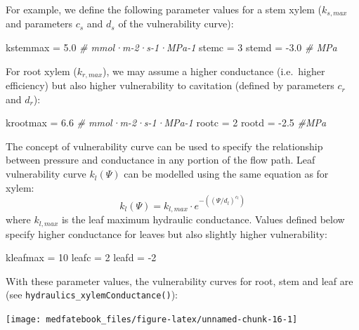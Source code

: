 \documentclass[]{book}
\newenvironment{Shaded}{\begin{snugshade}}{\end{snugshade}}
\newcommand{\DecValTok}[1]{\textcolor[rgb]{0.00,0.00,0.81}{#1}}
\newcommand{\FloatTok}[1]{\textcolor[rgb]{0.00,0.00,0.81}{#1}}
\newcommand{\StringTok}[1]{\textcolor[rgb]{0.31,0.60,0.02}{#1}}
\newcommand{\CommentTok}[1]{\textcolor[rgb]{0.56,0.35,0.01}{\textit{#1}}}
\newcommand{\NormalTok}[1]{#1}
\begin{document}
For example, we define the following parameter values for a stem xylem (\(k_{s,max}\) and parameters \(c_s\) and \(d_s\) of the vulnerability curve):

\begin{Shaded}
\begin{Highlighting}[]
\NormalTok{kstemmax =}\StringTok{ }\FloatTok{5.0} \CommentTok{# mmol·m-2·s-1·MPa-1}
\NormalTok{stemc =}\StringTok{ }\DecValTok{3} 
\NormalTok{stemd =}\StringTok{ }\FloatTok{-3.0} \CommentTok{# MPa}
\end{Highlighting}
\end{Shaded}

For root xylem (\(k_{r,max}\)), we may assume a higher conductance (i.e.~higher efficiency) but also higher vulnerability to cavitation (defined by parameters \(c_r\) and \(d_r\)):

\begin{Shaded}
\begin{Highlighting}[]
\NormalTok{krootmax =}\StringTok{ }\FloatTok{6.6} \CommentTok{# mmol·m-2·s-1·MPa-1}
\NormalTok{rootc =}\StringTok{ }\DecValTok{2}
\NormalTok{rootd =}\StringTok{ }\FloatTok{-2.5} \CommentTok{#MPa}
\end{Highlighting}
\end{Shaded}

The concept of vulnerability curve can be used to specify the relationship between pressure and conductance in any portion of the flow path. Leaf vulnerability curve \(k_l(\Psi)\) can be modelled using the same equation as for xylem:
\begin{equation}
k_l(\Psi) = k_{l,max}\cdot e^{-((\Psi/d_l)^{c_l})}
\label{eq:leafvulnerability}
\end{equation}
where \(k_{l,max}\) is the leaf maximum hydraulic conductance. Values defined below specify higher conductance for leaves but also slightly higher vulnerability:

\begin{Shaded}
\begin{Highlighting}[]
\NormalTok{kleafmax =}\StringTok{ }\DecValTok{10}
\NormalTok{leafc =}\StringTok{ }\DecValTok{2}
\NormalTok{leafd =}\StringTok{ }\DecValTok{-2}
\end{Highlighting}
\end{Shaded}

With these parameter values, the vulnerability curves for root, stem and leaf are (see \texttt{hydraulics\_xylemConductance()}):

\begin{center}\texttt{[image: medfatebook\_files/figure-latex/unnamed-chunk-16-1]} \end{center}
\end{document}
